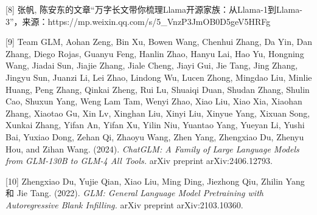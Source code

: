 \documentclass[
]{article}
\begin{document}
{[}8{]} 张帆,
陈安东的文章``万字长文带你梳理Llama开源家族：从Llama-1到Llama-3''，来源：https://mp.weixin.qq.com/s/5\_VnzP3JmOB0D5geV5HRFg

{[}9{]} Team GLM, Aohan Zeng, Bin Xu, Bowen Wang, Chenhui Zhang, Da Yin,
Dan Zhang, Diego Rojas, Guanyu Feng, Hanlin Zhao, Hanyu Lai, Hao Yu,
Hongning Wang, Jiadai Sun, Jiajie Zhang, Jiale Cheng, Jiayi Gui, Jie
Tang, Jing Zhang, Jingyu Sun, Juanzi Li, Lei Zhao, Lindong Wu, Lucen
Zhong, Mingdao Liu, Minlie Huang, Peng Zhang, Qinkai Zheng, Rui Lu,
Shuaiqi Duan, Shudan Zhang, Shulin Cao, Shuxun Yang, Weng Lam Tam, Wenyi
Zhao, Xiao Liu, Xiao Xia, Xiaohan Zhang, Xiaotao Gu, Xin Lv, Xinghan
Liu, Xinyi Liu, Xinyue Yang, Xixuan Song, Xunkai Zhang, Yifan An, Yifan
Xu, Yilin Niu, Yuantao Yang, Yueyan Li, Yushi Bai, Yuxiao Dong, Zehan
Qi, Zhaoyu Wang, Zhen Yang, Zhengxiao Du, Zhenyu Hou, and Zihan Wang.
(2024). \emph{ChatGLM: A Family of Large Language Models from GLM-130B
to GLM-4 All Tools.} arXiv preprint arXiv:2406.12793.

{[}10{]} Zhengxiao Du, Yujie Qian, Xiao Liu, Ming Ding, Jiezhong Qiu,
Zhilin Yang 和 Jie Tang. (2022). \emph{GLM: General Language Model
Pretraining with Autoregressive Blank Infilling.} arXiv preprint
arXiv:2103.10360.
\end{document}
